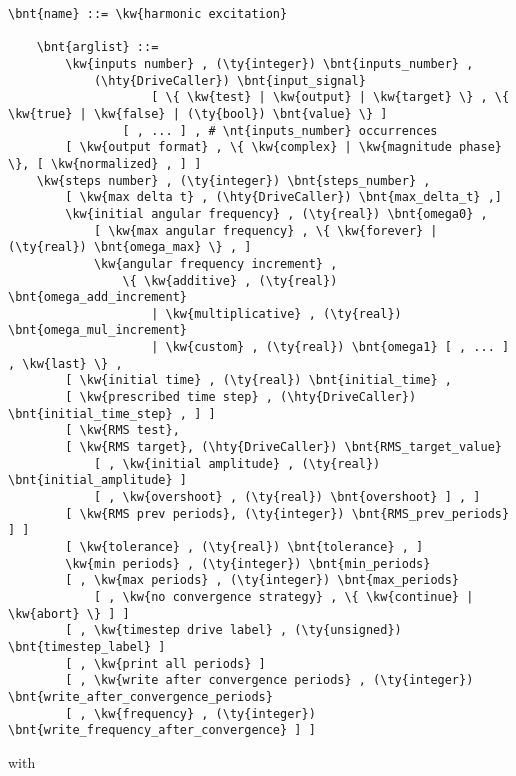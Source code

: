 \begin{Verbatim}[commandchars=\\\{\}]
    \bnt{name} ::= \kw{harmonic excitation}

    \bnt{arglist} ::=
        \kw{inputs number} , (\ty{integer}) \bnt{inputs_number} ,
            (\hty{DriveCaller}) \bnt{input_signal}
                    [ \{ \kw{test} | \kw{output} | \kw{target} \} , \{ \kw{true} | \kw{false} | (\ty{bool}) \bnt{value} \} ]
                [ , ... ] , # \nt{inputs_number} occurrences
        [ \kw{output format} , \{ \kw{complex} | \kw{magnitude phase} \}, [ \kw{normalized} , ] ]
	\kw{steps number} , (\ty{integer}) \bnt{steps_number} ,
        [ \kw{max delta t} , (\hty{DriveCaller}) \bnt{max_delta_t} ,]
        \kw{initial angular frequency} , (\ty{real}) \bnt{omega0} ,
            [ \kw{max angular frequency} , \{ \kw{forever} | (\ty{real}) \bnt{omega_max} \} , ]
            \kw{angular frequency increment} ,
                \{ \kw{additive} , (\ty{real}) \bnt{omega_add_increment}
                    | \kw{multiplicative} , (\ty{real}) \bnt{omega_mul_increment}
                    | \kw{custom} , (\ty{real}) \bnt{omega1} [ , ... ] , \kw{last} \} ,
        [ \kw{initial time} , (\ty{real}) \bnt{initial_time} ,
	    [ \kw{prescribed time step} , (\hty{DriveCaller}) \bnt{initial_time_step} , ] ]
        [ \kw{RMS test}, 
	    [ \kw{RMS target}, (\hty{DriveCaller}) \bnt{RMS_target_value} 
	        [ , \kw{initial amplitude} , (\ty{real}) \bnt{initial_amplitude} ]
	        [ , \kw{overshoot} , (\ty{real}) \bnt{overshoot} ] , ]
	    [ \kw{RMS prev periods}, (\ty{integer}) \bnt{RMS_prev_periods} ] ]
        [ \kw{tolerance} , (\ty{real}) \bnt{tolerance} , ]
        \kw{min periods} , (\ty{integer}) \bnt{min_periods}
        [ , \kw{max periods} , (\ty{integer}) \bnt{max_periods}
            [ , \kw{no convergence strategy} , \{ \kw{continue} | \kw{abort} \} ] ]
        [ , \kw{timestep drive label} , (\ty{unsigned}) \bnt{timestep_label} ]
        [ , \kw{print all periods} ]
        [ , \kw{write after convergence periods} , (\ty{integer}) \bnt{write_after_convergence_periods} 
	    [ , \kw{frequency} , (\ty{integer}) \bnt{write_frequency_after_convergence} ] ]
\end{Verbatim}
with
